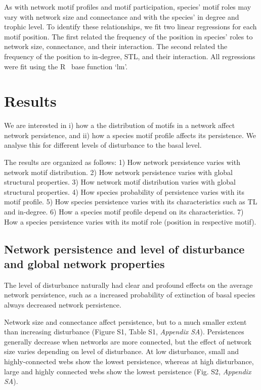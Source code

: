 \documentclass[12pt]{article}
\begin{document}
\begin{spacing}{2.0}
            As with network motif profiles and motif participation, species' motif roles may vary with network size and connectance and with the species' in degree and trophic level.
            To identify these relationships, we fit two linear regressions for each motif position.
            The first related the frequency of the position in species' roles to network size, connectance, and their interaction.
            The second related the frequency of the position to in-degree, STL, and their interaction.
            All regressions were fit using the R~\citep{R} base function `lm'.
            
            

\section*{Results}

We are interested in i) how a the distribution of motifs in a network affect network persistence, and ii) how a species motif profile affects its persistence. We analyse this for different levels of disturbance to the basal level. 

The results are organized as follows: 1) How network persistence varies with network motif distribution. 2) How network persistence varies with global structural properties. 3) How network motif distribution varies with global structural properties. 4) How species probability of persistence varies with its motif profile. 5) How species persistence varies with its characteristics such as TL and in-degree. 6) How a species motif profile depend on its characteristics. 7) How a species persistence  varies with its motif role (position in respective motif). 
    
    \subsection*{Network persistence and level of disturbance and global network properties}
    The level of disturbance naturally had clear and profound effects on the average network persistence, such as a increased probability of extinction of basal species always decreased network persistence. 
  
    Network size and connectance affect persistence, but to a much smaller extent than increasing disturbance (Figure S1, Table S1, \emph{Appendix SA}). Persistences generally decrease when networks are more connected, but the effect of network size varies depending on level of disturbance. At low disturbance, small and highly-connected webs show the lowest persistence, whereas at high disturbance, large and highly connected webs show the lowest persistence (Fig. S2, \emph{Appendix SA}).



\end{spacing}
\end{document}
